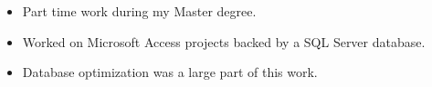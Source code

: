 \documentclass[10pt,a4paper]{../altacv}
\begin{document}
	\medskip\medskip{}
	
	\begin{itemize}
		\item Part time work during my Master degree.
		\item Worked on Microsoft Access projects backed by a SQL Server database.
		\item Database optimization was a large part of this work.
	\end{itemize}
	
	\medskip
	
	
	
	
	
	
	
	
	
	
	\newpage
	
\end{document}
